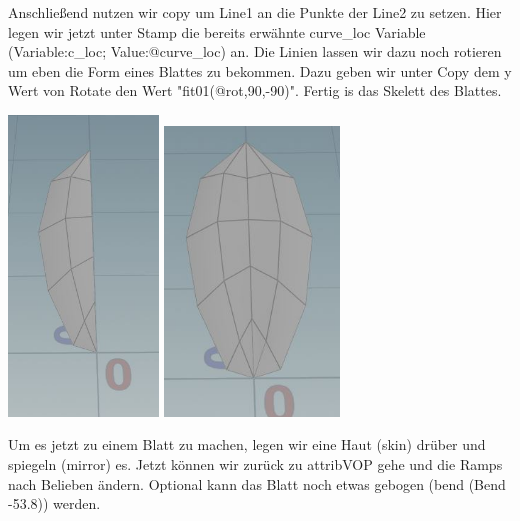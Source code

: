 \documentclass[paper=a4,fontsize=12pt,ngerman]{scrartcl}
\begin{document}
	\begin{minipage}{0.7\textwidth}
		Anschließend nutzen wir copy um Line1 an die Punkte der Line2 zu setzen. Hier legen wir jetzt unter Stamp die bereits erwähnte curve\_loc Variable (Variable:c\_loc; Value:@curve\_loc) an. Die Linien lassen wir dazu noch rotieren um eben die Form eines Blattes zu bekommen. Dazu geben wir unter Copy dem y Wert von Rotate den Wert "fit01(@rot,90,-90)". Fertig is das Skelett des Blattes.
	\end{minipage}

	\begin{minipage}{0.5\textwidth}
	\includegraphics[width=0.3\textwidth]{graphics/blossom2.JPG}
	\includegraphics[width=0.35\textwidth]{graphics/blossom3.JPG}
	\end{minipage}
	\begin{minipage}{0.5\textwidth}
		Um es jetzt zu einem Blatt zu machen, legen wir eine Haut (skin) drüber und spiegeln (mirror) es. Jetzt können wir zurück zu attribVOP gehe und die Ramps nach Belieben ändern. Optional kann das Blatt noch etwas gebogen (bend (Bend -53.8)) werden.
	\end{minipage}
	
\end{document}
